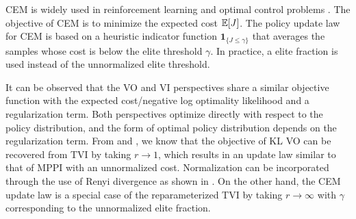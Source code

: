 \documentclass[twoside,11pt]{article}
\begin{document}
\ac{CEM} \citep{de2005tutorial} is widely used in reinforcement learning and optimal control problems \citep{mannor2003cross, kobilarov2012cross}.
The objective of \ac{CEM} is to minimize the expected cost $\mathbb{E} [J]$. The policy update law for \ac{CEM} is based on a heuristic indicator function $\bm{1}_{\{J\leq \gamma\}}$ that averages the samples whose cost is below the elite threshold $\gamma$. In practice, a elite fraction is used instead of the unnormalized elite threshold.


It can be observed that the \ac{VO} and \ac{VI} perspectives share a similar objective function with the expected cost/negative log optimality likelihood and a regularization term. Both perspectives optimize directly with respect to the policy distribution, and the form of optimal policy distribution depends on the regularization term. From  and , we know that the objective of KL \ac{VO} can be recovered from \ac{TVI} by taking $r\rightarrow 1$, which results in an update law similar to that of \ac{MPPI} with an unnormalized cost. Normalization can be incorporated through the use of Renyi divergence as shown in . On the other hand, the \ac{CEM} update law is a special case of the reparameterized \ac{TVI} by taking $r\rightarrow \infty$ with $\gamma$ corresponding to the unnormalized elite fraction.
\end{document}
